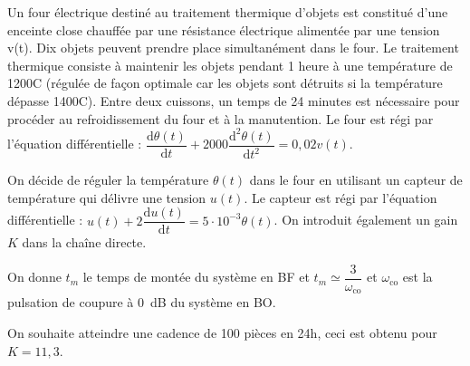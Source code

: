 \setcounter{exo}{0}
\begin{multicols}{2}




Un four électrique destiné au traitement thermique d'objets est constitué d'une enceinte close chauffée par une résistance électrique alimentée par une tension v(t). Dix objets peuvent prendre place simultanément dans le four. Le traitement thermique consiste à maintenir les objets pendant 1 heure à une température de 1200\degres C (régulée de façon optimale car les objets sont détruits si la température dépasse  1400\degres C).
Entre deux cuissons, un temps de 24 minutes est nécessaire pour procéder au refroidissement du four et à la manutention.
Le four est régi par l’équation différentielle : $\dfrac{\text{d}\theta(t)}{\text{d}t}+2000\dfrac{\text{d}^2\theta(t)}{\text{d}t^2}=0,02 v(t)$.



On décide de réguler la température $\theta(t)$ dans le four en utilisant un capteur de température qui délivre une tension $u(t)$. Le capteur est régi par l’équation différentielle :  $u(t)+2\dfrac{\text{d}u(t)}{\text{d}t}=5\cdot 10^{-3} \theta(t)$. On introduit également un gain $K$ dans la chaîne directe.



On donne $t_m$ le temps de montée du système en BF et $t_m\simeq \dfrac{3}{\omega_{\text{co}}}$ et $\omega_{\text{co}}$ est la pulsation de coupure à \SI{0}{dB} du système en BO.  

On souhaite atteindre une cadence de 100 pièces en 24h, ceci est obtenu pour $K=11,3$.




\end{multicols}
